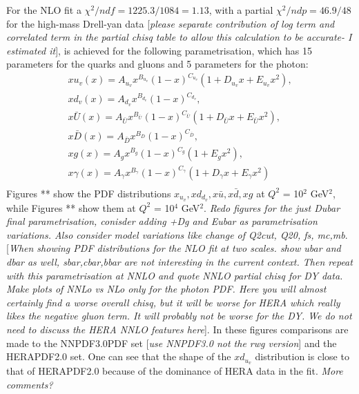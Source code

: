  For the NLO fit a $\chi^{2}/ndf = 1225.3/1084 = 1.13$, with a partial $\chi^2/ndp = 46.9/48$ for the high-mass Drell-yan data [{\it please separate contribution of log term and correlated term in the partial chisq table to allow this calculation to be accurate- I estimated it}], is achieved for the following parametrisation, which has 15 parameters for the quarks and gluons and 5 parameters for the photon:
\begin{eqnarray}
xu_v(x) = A_{u_v}x^{B_{u_v}}(1-x)^{C_{u_v}}(1+D_{u_v}x+E_{u_v}x^{2}), \\
xd_v(x) = A_{d_v}x^{B_{d_v}}(1-x)^{C_{d_v}}, \\
x\bar{U}(x) = A_{\bar{U}}x^{B_{\bar{U}}}(1-x)^{C_{\bar{U}}}(1+D_{\bar{U}}x+E_{\bar{U}}x^2), \\
x\bar{D}(x) = A_{\bar{D}}x^{B_{\bar{D}}}(1-x)^{C_{\bar{D}}}, \\
xg(x) = A_{g}x^{B_{g}}(1-x)^{C_{g}}(1+E_{g}x^{2}), \\
x\gamma(x) = A_{\gamma}x^{B_{\gamma}}(1-x)^{C_{\gamma}}(1+D_{\gamma}x+E_{\gamma}x^{2}) \\
\end{eqnarray}
Figures **%
 show the PDF distributions $x_{u_v},xd_{d_v},x\bar{u}, x\bar{d}, xg$ at $Q^{2}$ = 10$^{2}$ GeV$^{2}$, while  Figures **%
show them at $Q^{2}$ = 10$^{4}$ GeV$^{2}$. {\it Redo figures for the just Dubar final parametrisation, conisder adding +Dg and Eubar as parametrisation variations. Also consider model variations  like change of Q2cut, Q20, fs, mc,mb}.
[{\it When showing PDF distributions for the NLO fit at two scales.
show ubar and dbar as well, sbar,cbar,bbar are not interesting in the current context.
Then repeat with this parametrisation at NNLO and quote NNLO partial chisq for DY data. Make plots of NNLo vs NLo only for the photon PDF. 
Here you will almost 
certainly find a worse overall chisq, but it will be worse for HERA which really likes the 
negative gluon term. It will probably not be worse for the DY. We do not need to discuss the HERA NNLO features here}].
In these figures comparisons are made to the NNPDF3.0PDF set [{\it use NNPDF3.0 not the rwg version}] and the HERAPDF2.0 set.
One can see that the shape of the $xd_{u_v}$ distribution is close to that of HERAPDF2.0 
because of the dominance of HERA data in the fit. {\it More comments?}

